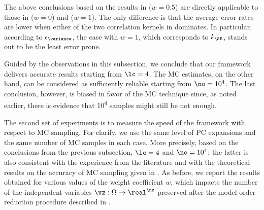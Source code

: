 The above conclusions based on the results in  ($w =
0.5$) are directly applicable to those in  ($w = 0$) and
 ($w = 1$). The only difference is that the average
error rates are lower when either of the two correlation kernels in
 dominates. In particular, according to
$\epsilon_{\variance}$, the case with $w = 1$, which corresponds to $k_\SE$,
stands out to be the least error prone.

Guided by the observations in this subsection, we conclude that our framework
delivers accurate results starting from $\lc = 4$. The \ac{MC} estimates, on the
other hand, can be considered as sufficiently reliable starting from $\no =
10^4$. The last conclusion, however, is biased in favor of the \ac{MC} technique
since, as noted earlier, there is evidence that 10\textsuperscript{4} samples
might still be not enough.


The second set of experiments is to measure the speed of the framework with
respect to \ac{MC} sampling. For clarify, we use the same level of \ac{PC}
expansions and the same number of \ac{MC} samples in each case. More precisely,
based on the conclusions from the previous subsection, $\lc = 4$ and $\no =
10^4$; the latter is also consistent with the experience from the literature
\cite{ghanta2006, bhardwaj2008, huang2009a, shen2009, lee2013} and with the
theoretical results on the accuracy of \ac{MC} sampling given in
\cite{diaz-emparanza2002}. As before, we report the results obtained for various
values of the weight coefficient $w$, which impacts the number of the
independent variables $\vz: \Omega \to \real^\nz$ preserved after the model
order reduction procedure described in .


